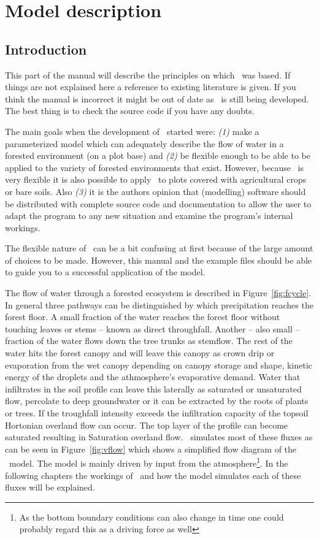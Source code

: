
\part{Model description}

\chapter{Introduction}
This part of the manual will describe the principles on which \vamps\
was based.  If things are not explained here a reference to existing
literature is given.  If you think the manual is incorrect it might be
out of date as \vamps\ is still being developed. The best thing is to
check the source code if you have any doubts.

The main goals when the development of \vamps\ started were: {\em (1)}
make a parameterized model which can adequately describe the flow of
water in a forested environment (on a plot base) and {\em (2)} be
flexible enough to be able to be applied to the variety of forested
environments that exist.  However, because \vamps\ is very flexible it
is also possible to apply \vamps\ to plots covered with agricultural
crops or bare soils.  Also {\em (3)} it is the authors opinion that
(modelling) software should be distributed with complete source code
and documentation to allow the user to adapt the program to any new
situation and examine the program's internal workings.  

The flexible nature of \vamps\ can be a bit confusing at first because
of the large amount of choices to be made. However, this manual and
the example files should be able to guide you to a successful
application of the \vamps{} model.

The flow of water through a forested ecosystem is described in
Figure~\ref{fig:fcycle}. In general three pathways can be distinguished
by which precipitation reaches the forest floor. A small fraction of
the water reaches the forest floor without touching leaves or stems --
known as direct throughfall. Another -- also small -- fraction of the
water flows down the tree trunks as stemflow. The rest of the water
hits the forest canopy and will leave this canopy as crown drip or
evaporation from the wet canopy depending on canopy storage and shape,
kinetic energy of the droplets and the athmosphere's evaporative demand.
Water that infiltrates in the soil profile can leave this laterally as
saturated or unsaturated flow, percolate to deep groundwater or it can
be extracted by the roots of plants or trees. If the troughfall intensity
exceeds the infiltration capacity of the topsoil Hortonian overland flow
can occur. The top layer of the profile can become saturated resulting
in Saturation overland flow. \vamps\ simulates most of these fluxes
as can be seen in Figure~\ref{fig:vflow} which shows a simplified flow
diagram of the \vamps\ model. The model is mainly driven by input from the
atmosphere\footnote{As the bottom boundary conditions can also change in
time one could probably regard this as a driving force as well}. In the
following chapters the workings of \vamps\ and how the model simulates
each of these fluxes will be explained.

